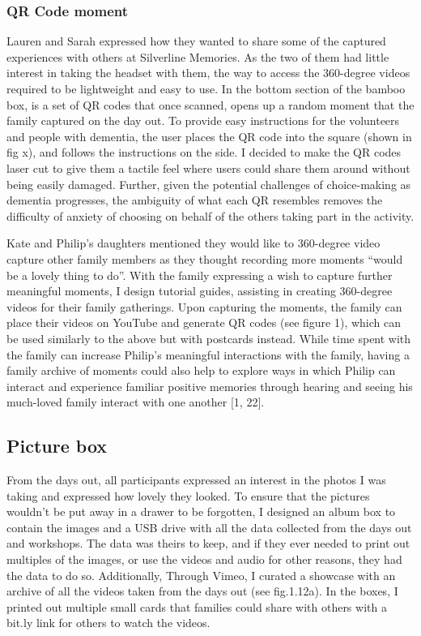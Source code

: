 \subsubsection{QR Code moment}
\label{QR-Code-Moments}
Lauren and Sarah expressed how they wanted to share some of the captured experiences with others at Silverline Memories. As the two of them had little interest in taking the headset with them, the way to access the 360-degree videos required to be lightweight and easy to use. In the bottom section of the bamboo box, is a set of QR codes that once scanned, opens up a random moment that the family captured on the day out. To provide easy instructions for the volunteers and people with dementia, the user places the QR code into the square (shown in fig x), and follows the instructions on the side. I decided to make the QR codes laser cut to give them a tactile feel where users could share them around without being easily damaged. Further, given the potential challenges of choice-making as dementia progresses, the ambiguity of what each QR resembles removes the difficulty of anxiety of choosing on behalf of the others taking part in the activity.

Kate and Philip's daughters mentioned they would like to 360-degree video capture other family members as they thought recording more moments ``would be a lovely thing to do''. With the family expressing a wish to capture further meaningful moments, I design tutorial guides, assisting in creating 360-degree videos for their family gatherings. Upon capturing the moments, the family can place their videos on YouTube and generate QR codes (see figure 1), which can be used similarly to the above but with postcards instead. While time spent with the family can increase Philip’s meaningful interactions with the family, having a family archive of moments could also help to explore ways in which Philip can interact and experience familiar positive memories through hearing and seeing his much-loved family interact with one another [1, 22].

\subsection{Picture box}
\label{PictureBox}
From the days out, all participants expressed an interest in the photos I was taking and expressed how lovely they looked. To ensure that the pictures wouldn't be put away in a drawer to be forgotten, I designed an album box to contain the images and a USB drive with all the data collected from the days out and workshops. The data was theirs to keep, and if they ever needed to print out multiples of the images, or use the videos and audio for other reasons, they had the data to do so. Additionally, Through Vimeo, I curated a showcase with an archive of all the videos taken from the days out (see fig.1.12a). In the boxes, I printed out multiple small cards that families could share with others with a bit.ly link for others to watch the videos. 







